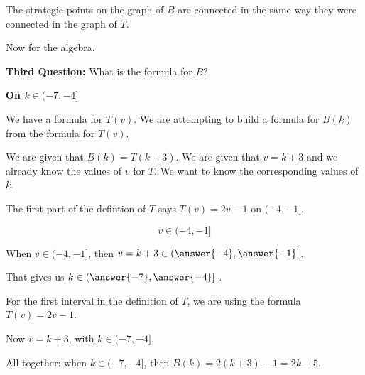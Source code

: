 \documentclass{ximera}
\begin{document}
The strategic points on the graph of $B$ are connected in the same way they were connected in the graph of $T$.







Now for the algebra.












\textbf{\textcolor{purple!85!blue}{Third Question:}} What is the formula for $B$?



\begin{explanation}  \textbf{\textcolor{red!75!green}{On $k \in (-7,-4]$}} 




We have a formula for $T(v)$.  We are attempting to build a formula for $B(k)$ from the formula for $T(v)$.

We are given that $B(k) = T(k+3)$.  We are given that $v = k+3$ and we already know the values of $v$ for $T$.  We want to know the corresponding values of $k$.

The first part of the defintion of $T$ says $T(v) = 2v - 1$ on $(-4,-1]$.

\[
v \in (-4,-1]
\]

When $v \in (-4,-1]$, then $v = k+3 \in \left(\answer{-4},\answer{-1}\right]$.  

That gives us $k \in \left(\answer{-7},\answer{-4}\right]$ .


For the first interval in the definition of $T$, we are using the formula $T(v) = 2v - 1$. 

Now $v = k + 3$, with $k \in (-7,-4]$.

All together: when $k \in (-7,-4]$, then $B(k) = 2(k+3)-1 = 2k+5$. 

\end{explanation}
\end{document}
